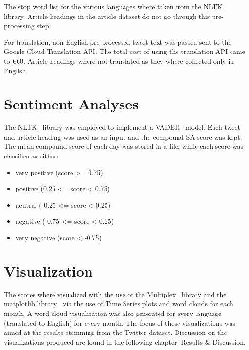 \noindent The stop word list for the various languages where taken from the \ac{NLTK}~\citep{bird2009natural} library.
Article headings in the article dataset do not go through this pre-processing step.

For translation, non-English pre-processed tweet text was passed sent to the Google Cloud Translation \ac{API}.
The total cost of using the translation \ac{API} came to €60.
Article headings where not translated as they where collected only in English.

\section{Sentiment Analyses}

The \ac{NLTK}~\citep{bird2009natural} library was employed to implement a \ac{VADER}~\citep{Hutto_Gilbert_2014} model.
Each tweet and article heading was used as an input and the compound \ac{SA} score was kept.
The mean compound score of each day was stored in a file, while each score was classifies as either:

\begin{itemize}
    \item very positive (score >= 0.75)
    \item positive (0.25 <= score < 0.75)
    \item neutral (-0.25 <= score < 0.25)
    \item negative (-0.75 <= score < 0.25)
    \item very negative (score < -0.75)
\end{itemize}

\section{Visualization}

The  scores where visualized with the use of the Multiplex~\citep{Mamo2021} library and the matplotlib library~\citep{Hunter:2007} via the use of Time Series plots and word clouds for each month.
A word cloud visualization was also generated for every language (translated to English) for every month.
The focus of these visualizations was aimed at the results stemming from the Twitter dataset.
Discussion on the visualizations produced are found in the following chapter, Results \& Discussion.